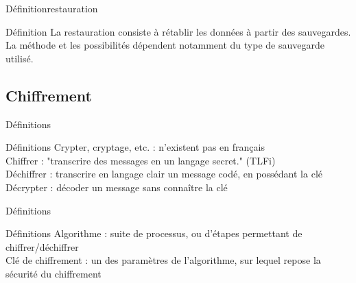 \documentclass[12pt]{beamer}
\begin{document}
		\begin{frame}{Définition}{restauration}
			\begin{exampleblock}{Définition}
				La \alert{restauration} consiste à rétablir les données à partir des sauvegardes. La méthode et les possibilités dépendent notamment du type
				de sauvegarde utilisé.
			\end{exampleblock}
		\end{frame}

	\subsection{Chiffrement}
	
		\begin{frame}{Définitions}
			\begin{exampleblock}{Définitions}
				\alert{Crypter, cryptage, etc.} : n'existent pas en français  \\
				\alert{Chiffrer} : "transcrire des messages en un langage secret." (TLFi) \\
				\alert{Déchiffrer} : transcrire en langage clair un message codé, en possédant la clé \\
				\alert{Décrypter} : décoder un message sans connaître la clé
			\end{exampleblock}
		\end{frame}
		
		\begin{frame}{Définitions}
			\begin{exampleblock}{Définitions}
				\alert{Algorithme} : suite de processus, ou d'étapes permettant de chiffrer/déchiffrer\\
				\alert{Clé de chiffrement} : un des paramètres de l'algorithme, sur lequel repose la sécurité du chiffrement
			\end{exampleblock}
		\end{frame}
		
\end{document}
